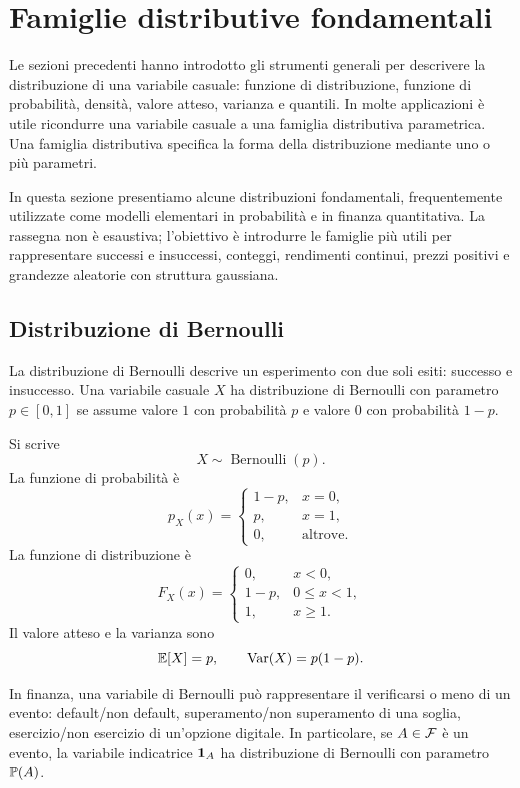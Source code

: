 \section{Famiglie distributive fondamentali}
\label{sec:cap2-famiglie-distributive}

Le sezioni precedenti hanno introdotto gli strumenti generali per descrivere la
distribuzione di una variabile casuale: funzione di distribuzione, funzione di
probabilit\`{a}, densit\`{a}, valore atteso, varianza e quantili. In molte
applicazioni \`{e} utile ricondurre una variabile casuale a una famiglia
distributiva parametrica. Una famiglia distributiva specifica la forma della
distribuzione mediante uno o pi\`{u} parametri.

In questa sezione presentiamo alcune distribuzioni fondamentali, frequentemente
utilizzate come modelli elementari in probabilit\`{a} e in finanza quantitativa.
La rassegna non \`{e} esaustiva; l'obiettivo \`{e} introdurre le famiglie pi\`{u}
utili per rappresentare successi e insuccessi, conteggi, rendimenti continui,
prezzi positivi e grandezze aleatorie con struttura gaussiana.

\subsection{Distribuzione di Bernoulli}

La distribuzione di Bernoulli descrive un esperimento con due soli esiti:
successo e insuccesso. Una variabile casuale $X$ ha distribuzione di Bernoulli
con parametro $p\in[0,1]$ se assume valore $1$ con probabilit\`{a} $p$ e valore
$0$ con probabilit\`{a} $1-p$.

Si scrive
\[
X\sim \operatorname{Bernoulli}(p).
\]
La funzione di probabilit\`{a} \`{e}
\[
p_X(x)=
\begin{cases}
1-p, & x=0,\\
p, & x=1,\\
0, & \mbox{altrove}.
\end{cases}
\]
La funzione di distribuzione \`{e}
\[
F_X(x)=
\begin{cases}
0, & x<0,\\
1-p, & 0\leq x<1,\\
1, & x\geq 1.
\end{cases}
\]
Il valore atteso e la varianza sono
\[
\mathbb{E}[X]=p,
\qquad
\operatorname{Var}(X)=p(1-p).
\]

In finanza, una variabile di Bernoulli pu\`{o} rappresentare il verificarsi o
meno di un evento: default/non default, superamento/non superamento di una
soglia, esercizio/non esercizio di un'opzione digitale. In particolare, se
$A\in\mathcal{F}$ \`{e} un evento, la variabile indicatrice $\mathbf{1}_A$ ha distribuzione
di Bernoulli con parametro $\mathbb{P}(A)$.


